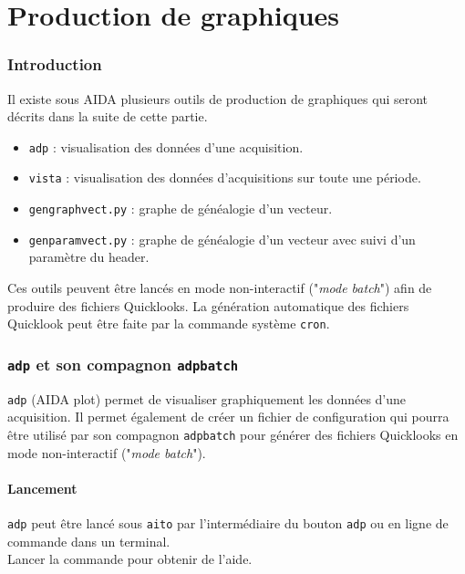 \part{Production de graphiques}

\label{part:graphe}
\section{Introduction}
Il existe sous AIDA plusieurs outils de production de graphiques qui seront
décrits dans la suite de cette partie.

\begin{itemize}
    \item[•] \texttt{adp}             : visualisation des données d'une
                                        acquisition.
    \item[•] \texttt{vista}           : visualisation des données d'acquisitions
                                        sur toute une période.
    \item[•] \texttt{gengraphvect.py} : graphe de généalogie d'un vecteur.
    \item[•] \texttt{genparamvect.py} : graphe de généalogie d'un vecteur avec
                                        suivi d'un paramètre du header.
\end{itemize}

Ces outils peuvent être lancés en mode non-interactif ("\textit{mode batch}")
afin de produire des fichiers Quicklooks.
La génération automatique des fichiers Quicklook peut être faite
par la commande système \texttt{cron}.


\section{\texttt{adp} et son compagnon \texttt{adpbatch}}
\texttt{adp} (AIDA plot) permet de visualiser graphiquement les données d'une
acquisition.
Il permet également de créer un fichier de configuration qui pourra être
utilisé par son compagnon \texttt{adpbatch} pour générer des fichiers
Quicklooks en mode non-interactif ("\textit{mode batch}").

\subsection{Lancement}
\texttt{adp} peut être lancé sous \texttt{aito} par l'intermédiaire du bouton
\texttt{adp}
ou en ligne de commande dans un terminal. \\
Lancer la commande  pour obtenir de l'aide.

